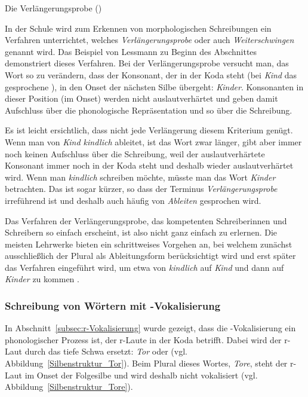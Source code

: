 \begin{Exkurs}{Die Verlängerungsprobe ()}

\noindent In der Schule wird zum Erkennen von morphologischen Schreibungen ein Verfahren unterrichtet, welches \textit{Verlängerungsprobe} oder auch \textit{Weiterschwingen} genannt wird. Das Beispiel von Lessmann zu Beginn des Abschnittes demonstriert dieses Verfahren. Bei der Verlängerungsprobe versucht man, das Wort so zu verändern, dass der Konsonant, der in der Koda steht (bei \textit{Kind} das gesprochene \textipa{[t]}), in den Onset der nächsten Silbe übergeht:  \textit{Kinder}. Konsonanten in dieser Position (im Onset) werden nicht auslautverhärtet und geben damit Aufschluss über die phonologische Repräsentation und so über die Schreibung.

Es ist leicht ersichtlich, dass nicht jede Verlängerung diesem Kriterium genügt. Wenn man von \textit{Kind kindlich} ableitet, ist das Wort zwar länger, gibt aber immer noch keinen Aufschluss über die Schreibung, weil der auslautverhärtete Konsonant immer noch in der Koda steht und deshalb wieder auslautverhärtet wird. Wenn man \textit{kindlich} schreiben möchte, müsste man das Wort \textit{Kinder} betrachten. Das ist sogar kürzer, so dass der Terminus \textit{Verlängerungsprobe} irreführend ist und deshalb auch häufig von \textit{Ableiten} gesprochen wird.

Das Verfahren der Verlängerungsprobe, das kompetenten Schreiberinnen und Schreibern so einfach erscheint, ist also nicht ganz einfach zu erlernen. Die meisten Lehrwerke bieten ein schrittweises Vorgehen an, bei welchem zunächst ausschließlich der Plural als Ableitungsform berücksichtigt wird und erst später das Verfahren  eingeführt wird, um etwa von \textit{kindlich} auf \textit{Kind} und dann auf \textit{Kinder} zu kommen \citep{Lessmann2009}.
\end{Exkurs}

\subsubsection{Schreibung von Wörtern mit -Vokalisierung}

In Abschnitt~\ref{subsec:r-Vokalisierung} wurde gezeigt, dass die -Vokalisierung ein phonologischer Prozess ist, der r-Laute in der Koda betrifft. Dabei wird der r-Laut durch das tiefe Schwa ersetzt: \textit{Tor} \textipa{[to:5]} oder \textipa{[t\t*{o5}]} (vgl. Abbildung~\ref{Silbenstruktur_Tor}).
Beim Plural dieses Wortes, \textit{Tore}, steht der r-Laut im Onset der Folgesilbe und wird deshalb nicht vokalisiert (vgl. Abbildung~\ref{Silbenstruktur_Tore}).

